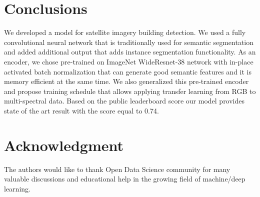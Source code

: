 \documentclass[10pt,twocolumn,letterpaper]{article}
\begin{document}
\section{Conclusions}
We developed a model for satellite imagery building detection. We used a fully convolutional neural network that is traditionally used for semantic segmentation and added additional output that adds instance segmentation functionality. As an encoder, we chose pre-trained on ImageNet WideResnet-38 network with in-place activated batch normalization that can generate good semantic features and it is memory efficient at the same time. We also generalized this pre-trained encoder and propose training schedule that allows applying transfer learning from RGB to multi-spectral data. Based on the public leaderboard score our model provides state of the art result with the score equal to 0.74.

\section*{Acknowledgment}
The authors would like to thank Open Data Science community \cite{ods_website} for many valuable discussions and educational help in the growing field of machine/deep learning.
  

{\small


}
\end{document}
